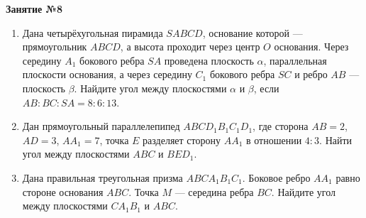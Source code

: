 \documentclass[12pt, a4paper]{article}
\begin{document}
	
   \cfoot{}
\begin{center}
	\Large
	\textbf{Занятие №8}
\end{center}
\begin{enumerate}[label=\textbf{\arabic*.}]
	\item Дана четырёхугольная пирамида \( SABCD \), основание которой --- прямоугольник \( ABCD \), а высота проходит через центр \( O \)
	основания. Через середину \( A_1 \) бокового ребра \( SA \) проведена плоскость \( \alpha \), параллельная плоскости основания, а через середину \( C_1 \) бокового ребра \( SC \) и ребро \( AB \) --- плоскость \( \beta \). Найдите угол между плоскостями \( \alpha \) и \( \beta \), если \( AB : BC : SA=8 : 6 : 13 \).
	\item Дан прямоугольный параллелепипед \( ABCD_1B_1C_1D_1 \), где сторона \( AB = 2 \), \( AD = 3 \), \( AA_1 = 7 \), точка \( E \) разделяет сторону \( AA_1 \) в отношении \( 4:3 \). Найти угол между плоскостями \( ABC \) и \( BED_1 \).
	\item Дана правильная треугольная призма \( ABCA_1B_1C_1 \). Боковое ребро \( AA_1 \) равно стороне основания \( ABC \). Точка \( M \) --- середина ребра \( BC \). Найдите угол между плоскостями \( CA_1B_1 \) и \( ABC \).
\end{enumerate}
\end{document}
